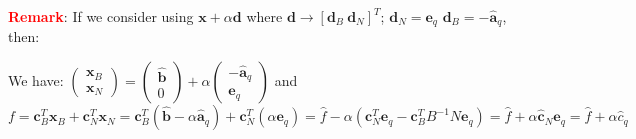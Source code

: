 \documentclass[9pt]{article}
\begin{document}
\textcolor{red}{\textbf{Remark}}: If we consider using $\mathbf{x}+\alpha\mathbf{d}$ where $\mathbf{d}\to[\mathbf{d}_B \ \mathbf{d}_N]^T$; $\mathbf{d}_N=\mathbf{e}_q$ $\mathbf{d}_B=-\widehat{\mathbf{a}}_q$, then:

We have: {\scriptsize $\begin{pmatrix}\mathbf{x}_B \\ \mathbf{x}_N\end{pmatrix}=\begin{pmatrix}\widehat{\mathbf{b}} \\ 0\end{pmatrix}+\alpha\begin{pmatrix}-\widehat{\mathbf{a}}_q \\ \mathbf{e}_q\end{pmatrix}$} and $f=\mathbf{c}^T_B\mathbf{x}_B+\mathbf{c}^T_N\mathbf{x}_N=\mathbf{c}^T_B(\widehat{\mathbf{b}}-\alpha\widehat{\mathbf{a}}_q)+\mathbf{c}^T_N(\alpha\mathbf{e}_q)=\widehat{f}-\alpha(\mathbf{c}^T_N\mathbf{e}_q-\mathbf{c}_B^TB^{-1}N\mathbf{e}_q)=\widehat{f}+\alpha\widehat{\mathbf{c}}_N\mathbf{e}_q=\widehat{f}+\alpha\widehat{c}_q$
\end{document}

